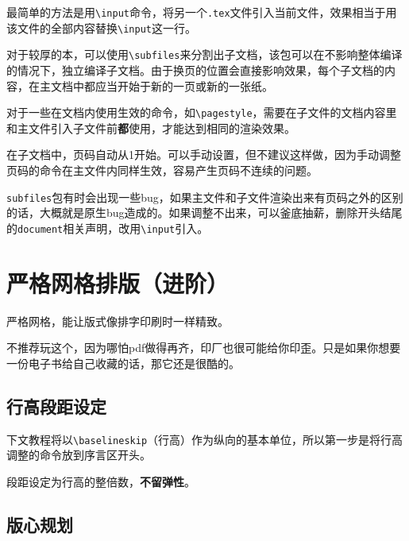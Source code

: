 \documentclass[10pt,openany]{book}
\begin{document}
最简单的方法是用\texttt{\textbackslash{}input}命令，将另一个\texttt{.tex}文件引入当前文件，效果相当于用该文件的全部内容替换\texttt{\textbackslash{}input}这一行。



对于较厚的本，可以使用\texttt{\textbackslash{}subfiles}来分割出子文档，该包可以在不影响整体编译的情况下，独立编译子文档。由于换页的位置会直接影响效果，每个子文档的内容，在主文档中都应当开始于新的一页或新的一张纸。



对于一些在文档内使用生效的命令，如\texttt{\textbackslash{}pagestyle}，需要在子文件的文档内容里和主文件引入子文件前\textbf{都}使用，才能达到相同的渲染效果。

在子文档中，页码自动从1开始。可以手动设置，但不建议这样做，因为手动调整页码的命令在主文件内同样生效，容易产生页码不连续的问题。

\texttt{subfiles}包有时会出现一些bug，如果主文件和子文件渲染出来有页码之外的区别的话，大概就是原生bug造成的。如果调整不出来，可以釜底抽薪，删除开头结尾的\texttt{document}相关声明，改用\texttt{\textbackslash{}input}引入。

\chapter{严格网格排版（进阶）}

严格网格，能让版式像排字印刷时一样精致。

不推荐玩这个，因为哪怕pdf做得再齐，印厂也很可能给你印歪。只是如果你想要一份电子书给自己收藏的话，那它还是很酷的。

\section{行高段距设定}

下文教程将以\texttt{\textbackslash{}baselineskip}（行高）作为纵向的基本单位，所以第一步是将行高调整的命令放到序言区开头。



段距设定为行高的整倍数，\textbf{不留弹性}。



\section{版心规划}
\end{document}
